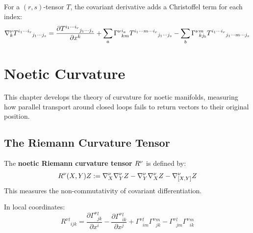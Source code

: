 \begin{definition}
\label{def:cov-deriv-tensors}
For a $(r, s)$-tensor $T$, the covariant derivative adds a Christoffel
term for each index:
\[
    \nabla^\nu_k T^{i_1 \cdots i_r}{}_{j_1 \cdots j_s} =
    \frac{\partial T^{i_1 \cdots i_r}{}_{j_1 \cdots j_s}}{\partial x^k}
    + \sum_a \Gamma^\nu{}^{i_a}_{km} T^{i_1 \cdots m \cdots i_r}{}_{j_1 \cdots j_s}
    - \sum_b \Gamma^\nu{}^m_{kj_b} T^{i_1 \cdots i_r}{}_{j_1 \cdots m \cdots j_s}
\]
\end{definition}


\chapter{Noetic Curvature}
\label{ch:noetic-curvature}

\begin{tcolorbox}[colback=blue!5!white,colframe=blue!75!black,title=\vnewfour]
This chapter develops the theory of curvature for noetic manifolds, measuring
how parallel transport around closed loops fails to return vectors to
their original position.
\end{tcolorbox}

\section{The Riemann Curvature Tensor}

\begin{definition}
\label{def:riemann-curvature}
The \textbf{noetic Riemann curvature tensor} $R^\nu$ is defined by:
\[
    R^\nu(X, Y)Z := \nabla^\nu_X \nabla^\nu_Y Z
    - \nabla^\nu_Y \nabla^\nu_X Z - \nabla^\nu_{[X,Y]} Z
\]
This measures the non-commutativity of covariant differentiation.
\end{definition}

\begin{proposition}
\label{prop:curvature-components}
In local coordinates:
\[
    R^\nu{}^l{}_{ijk} = \frac{\partial \Gamma^\nu{}^l_{jk}}{\partial x^i}
    - \frac{\partial \Gamma^\nu{}^l_{ik}}{\partial x^j}
    + \Gamma^\nu{}^l_{im} \Gamma^\nu{}^m_{jk}
    - \Gamma^\nu{}^l_{jm} \Gamma^\nu{}^m_{ik}
\]
\end{proposition}

